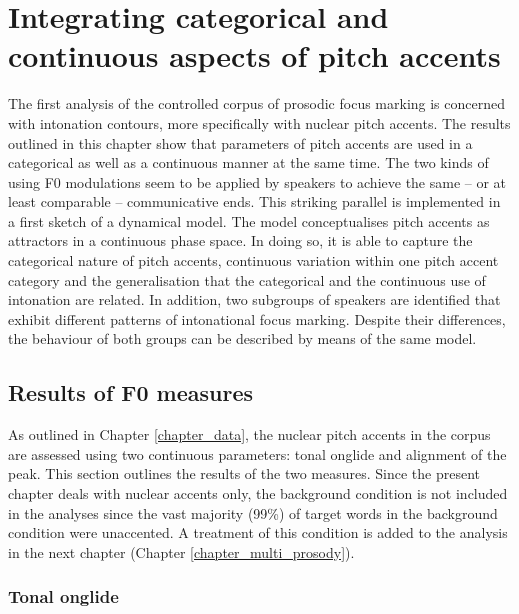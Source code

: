 \chapter{Integrating categorical and continuous aspects of pitch accents}
\label{chapter_onglide_modelling}

The first analysis of the controlled corpus of prosodic focus marking is concerned with intonation contours, more specifically with nuclear pitch accents. The results outlined in this chapter show that parameters of pitch accents are used in a categorical as well as a continuous manner at the same time. The two kinds of using F0 modulations seem to be applied by speakers to achieve the same -- or at least comparable -- communicative ends. This striking parallel is implemented in a first sketch of a dynamical model. The model conceptualises pitch accents as attractors in a continuous phase space. In doing so, it is able to capture the categorical nature of pitch accents, continuous variation within one pitch accent category and the generalisation that the categorical and the continuous use of intonation are related. In addition, two subgroups of speakers are identified that exhibit different patterns of intonational focus marking. Despite their differences, the behaviour of both groups can be described by means of the same model.

\section{Results of F0 measures}

As outlined in Chapter \ref{chapter_data}, the nuclear pitch accents in the corpus are assessed using two continuous parameters: tonal onglide and alignment of the peak. This section outlines the results of the two measures. Since the present chapter deals with nuclear accents only, the background condition is not included in the analyses since the vast majority (99\%) of target words in the background condition were unaccented. A treatment of this condition is added to the analysis in the next chapter (Chapter \ref{chapter_multi_prosody}).

\subsection{Tonal onglide}

